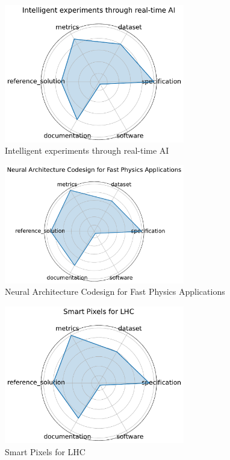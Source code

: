 \documentclass{article}
\begin{document}
\begin{figure}[h!]
  \centering
  \includegraphics[width=0.7\textwidth]{Intelligent experiments through real-time AI_radar.pdf}
  \caption{Intelligent experiments through real-time AI \cite{kvapil2025intelligentexperimentsrealtimeai}}
\end{figure}

\begin{figure}[h!]
  \centering
  \includegraphics[width=0.7\textwidth]{Neural Architecture Codesign for Fast Physics Applications_radar.pdf}
  \caption{Neural Architecture Codesign for Fast Physics Applications \cite{weitz2025neuralarchitecturecodesignfast}}
\end{figure}

\begin{figure}[h!]
  \centering
  \includegraphics[width=0.7\textwidth]{Smart Pixels for LHC_radar.pdf}
  \caption{Smart Pixels for LHC \cite{parpillon2024smartpixelsinpixelai}}
\end{figure}
\end{document}
